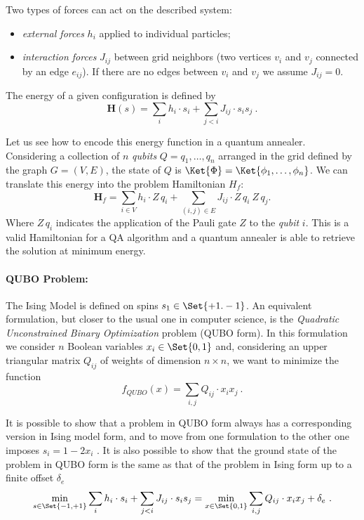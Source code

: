 Two types of forces can act on the described system:
\begin{itemize}
	\item \emph{external forces} $h_i$ applied to individual particles;
	\item \emph{interaction forces} $J_{ij}$ between grid neighbors (two vertices $v_i$ and $v_j$ connected by an edge $e_{ij}$). If there are no edges between $v_i$ and $v_j$ we assume $J_{ij} = 0$.
\end{itemize}

The energy of a given configuration is defined by
\begin{equation}
	\mathbf{H}(s) =  \sum_{i}h_i\cdot s_i + \sum_{j < i} J_{ij}\cdot s_i s_j \ .
	\label{eqn:ising}
\end{equation}

Let us see how to encode this energy function in a quantum annealer. Considering a collection of $n$ \emph{qubits} $Q = q_1,\dots, q_n$ arranged in the grid defined by the graph $G = (V, E)$, the state of $Q$ is $\Ket{\Phi} = \Ket{\phi_1, \dots, \phi_n}$. We can translate this energy into the problem Hamiltonian $H_f$:
\begin{equation}
	\mathbf{H}_f =  \sum_{i\in V}h_i\cdot Z\,q_i + \sum_{(i,j) \in E} J_{ij}\cdot Z\,q_i\ Z\,q_j.
\end{equation}
Where $Z\,q_i$ indicates the application of the Pauli gate $Z$ to the \emph{qubit} $i$. This is a valid Hamiltonian for a QA algorithm and a quantum annealer is able to retrieve the solution at minimum energy.

\paragraph{QUBO Problem:} The Ising Model is defined on spins $s_1 \in \Set{+1. -1}$. An equivalent formulation, but closer to the usual one in computer science, is the \emph{Quadratic Unconstrained Binary Optimization} problem (QUBO form). In this formulation we consider $n$ Boolean variables $x_i \in \Set{0,1}$ and, considering an upper triangular matrix $Q_{ij}$ of weights of dimension $n\times n$, we want to minimize the function
\begin{equation}
	f_{QUBO}(x) =  \sum_{i, j}Q_{ij}\cdot x_ix_j\ .
	\label{eqn:qubo}
\end{equation}

It is possible to show that a problem in QUBO form always has a corresponding version in Ising model form, and to move from one formulation to the other one imposes $s_i = 1 - 2 x_i$ \cite{bian2010ising}. It is also possible to show that the ground state of the problem in QUBO form is the same as that of the problem in Ising form up to a finite offset $\delta_e$
\begin{equation}
	\min_{s\in\Set{-1, +1}}  \sum_{i}h_i\cdot s_i + \sum_{j < i} J_{ij}\cdot s_i s_j = \min_{x\in\Set{0, 1}} \sum_{i, j}Q_{ij}\cdot x_ix_j + \delta_e\ .
	\label{eqn:ising_qubo}
\end{equation}

